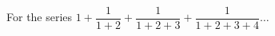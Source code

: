 
%
%
%
%
% 
% 

\question For the series $1 + \dfrac{1}{1+2} + \dfrac{1}{1+2+3} + \dfrac{1}{1+2+3+4}\ldots$


\ifprintanswers
\fi 

